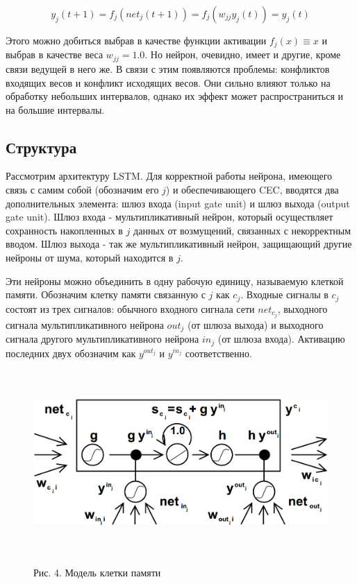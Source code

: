 \documentclass[14pt]{article}
\begin{document}
\begin{equation}
y_j(t+1) = f_j(net_j(t+1)) = f_j(w_{jj}y_j(t)) = y_j(t)
\end{equation}

Этого можно добиться выбрав в качестве функции активации $f_j(x) \equiv x$ и выбрав в качестве веса $w_{jj} = 1.0$. Но нейрон, очевидно, имеет и другие, кроме связи ведущей в него же. В связи с этим появляются проблемы: конфликтов входящих весов и конфликт исходящих весов. Они сильно влияют только на обработку небольших интервалов, однако их эффект может распространиться и на большие интервалы.

\subsection{Структура}
Рассмотрим архитектуру LSTM. Для корректной работы нейрона, имеющего связь с самим собой (обозначим его $j$) и обеспечивающего CEC, вводятся два дополнительных элемента: шлюз входа (input gate unit) и шлюз выхода (output gate unit). Шлюз входа - мультипликативный нейрон, который осуществляет сохранность накопленных в $j$ данных от возмущений, связанных с некорректным вводом. Шлюз выхода - так же  мультипликативный нейрон, защищающий другие нейроны от шума, который находится в $j$.


Эти нейроны можно объединить в одну рабочую единицу, называемую клеткой памяти. Обозначим клетку памяти связанную с $j$ как $c_j$. Входные сигналы в $c_j$ состоят из трех сигналов: обычного входного сигнала сети $net_{c_j}$, выходного сигнала мультипликативного нейрона $out_j$ (от шлюза выхода) и выходного сигнала другого мультипликативного нейрона $in_j$ (от шлюза входа). Активацию последних двух обозначим как $y^{out_j}$ и $y^{in_j}$ соответственно.

\begin{figure}[!h]
    \centering
        \includegraphics[height=7cm]{Fig3.png}
    \parbox[t][1.2cm][c]{16cm}{
        \centering
        Рис. 4. Модель клетки памяти
    }
\end{figure}
\end{document}
